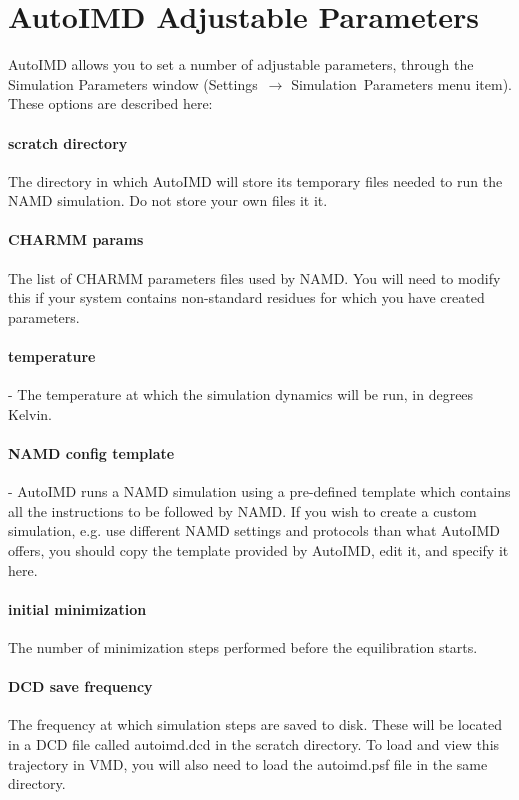 \section{AutoIMD Adjustable Parameters}
\label{par:params}

AutoIMD allows you to set a number of adjustable parameters, through the Simulation Parameters window ({\gui Settings~$\to$ Simulation~Parameters} menu item). These options are described here:

\paragraph {scratch directory} The directory in which AutoIMD will store its temporary files needed to run the NAMD simulation. Do not store your own files it it.

\paragraph {CHARMM params} The list of CHARMM parameters files used by NAMD. You will need to modify this if your system contains non-standard residues for which you have created parameters.

\paragraph {temperature} - The temperature at which the simulation dynamics will be run, in degrees Kelvin.

\paragraph {NAMD config template} - AutoIMD runs a NAMD simulation using a pre-defined template which contains all the instructions to be followed by NAMD. If you wish to create a custom simulation, e.g. use different NAMD settings and protocols than what AutoIMD offers, you should copy the template provided by AutoIMD, edit it, and specify it here.

\paragraph {initial minimization} The number of minimization steps performed before the equilibration starts.

\paragraph {DCD save frequency} The frequency at which simulation steps are saved to disk. These will be located in a DCD file called autoimd.dcd in the scratch directory. To load and view this trajectory in VMD, you will also need to load the autoimd.psf file in the same directory.

